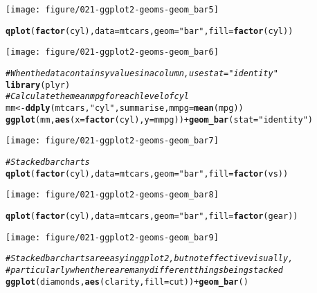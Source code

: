 \documentclass[a4paper,titlepage]{tufte-handout}\usepackage[]{graphicx}\usepackage[]{color}
\makeatletter
\def\maxwidth{ %
  \ifdim\Gin@nat@width>\linewidth
    \linewidth
  \else
    \Gin@nat@width
  \fi
}
\newcommand{\hlstr}[1]{\textcolor[rgb]{0.192,0.494,0.8}{#1}}%
\newcommand{\hlcom}[1]{\textcolor[rgb]{0.678,0.584,0.686}{\textit{#1}}}%
\newcommand{\hlopt}[1]{\textcolor[rgb]{0,0,0}{#1}}%
\newcommand{\hlstd}[1]{\textcolor[rgb]{0.345,0.345,0.345}{#1}}%
\newcommand{\hlkwb}[1]{\textcolor[rgb]{0.69,0.353,0.396}{#1}}%
\newcommand{\hlkwc}[1]{\textcolor[rgb]{0.333,0.667,0.333}{#1}}%
\newcommand{\hlkwd}[1]{\textcolor[rgb]{0.737,0.353,0.396}{\textbf{#1}}}%
\newenvironment{kframe}{%
 \def\at@end@of@kframe{}%
 \ifinner\ifhmode%
  \def\at@end@of@kframe{\end{minipage}}%
  \begin{minipage}{\columnwidth}%
 \fi\fi%
 \def\FrameCommand##1{\hskip\@totalleftmargin \hskip-\fboxsep
 \colorbox{shadecolor}{##1}\hskip-\fboxsep
     \hskip-\linewidth \hskip-\@totalleftmargin \hskip\columnwidth}%
 \MakeFramed {\advance\hsize-\width
   \@totalleftmargin\z@ \linewidth\hsize
   \@setminipage}}%
 {\par\unskip\endMakeFramed%
 \at@end@of@kframe}
\newenvironment{knitrout}{}{} %
\makeatother
\begin{document}
\begin{knitrout}
\begin{kframe}
\end{kframe}
\texttt{[image: figure/021-ggplot2-geoms-geom\_bar5]} 
\begin{kframe}\begin{alltt}
\hlkwd{qplot}\hlstd{(}\hlkwd{factor}\hlstd{(cyl),} \hlkwc{data}\hlstd{=mtcars,} \hlkwc{geom}\hlstd{=}\hlstr{"bar"}\hlstd{,} \hlkwc{fill}\hlstd{=}\hlkwd{factor}\hlstd{(cyl))}
\end{alltt}
\end{kframe}
\texttt{[image: figure/021-ggplot2-geoms-geom\_bar6]} 
\begin{kframe}\begin{alltt}
\hlcom{# When the data contains y values in a column, use stat="identity"}
\hlkwd{library}\hlstd{(plyr)}
\hlcom{# Calculate the mean mpg for each level of cyl}
\hlstd{mm} \hlkwb{<-} \hlkwd{ddply}\hlstd{(mtcars,} \hlstr{"cyl"}\hlstd{, summarise,} \hlkwc{mmpg} \hlstd{=} \hlkwd{mean}\hlstd{(mpg))}
\hlkwd{ggplot}\hlstd{(mm,} \hlkwd{aes}\hlstd{(}\hlkwc{x} \hlstd{=} \hlkwd{factor}\hlstd{(cyl),} \hlkwc{y} \hlstd{= mmpg))} \hlopt{+} \hlkwd{geom_bar}\hlstd{(}\hlkwc{stat} \hlstd{=} \hlstr{"identity"}\hlstd{)}
\end{alltt}
\end{kframe}
\texttt{[image: figure/021-ggplot2-geoms-geom\_bar7]} 
\begin{kframe}\begin{alltt}
\hlcom{# Stacked bar charts}
\hlkwd{qplot}\hlstd{(}\hlkwd{factor}\hlstd{(cyl),} \hlkwc{data}\hlstd{=mtcars,} \hlkwc{geom}\hlstd{=}\hlstr{"bar"}\hlstd{,} \hlkwc{fill}\hlstd{=}\hlkwd{factor}\hlstd{(vs))}
\end{alltt}
\end{kframe}
\texttt{[image: figure/021-ggplot2-geoms-geom\_bar8]} 
\begin{kframe}\begin{alltt}
\hlkwd{qplot}\hlstd{(}\hlkwd{factor}\hlstd{(cyl),} \hlkwc{data}\hlstd{=mtcars,} \hlkwc{geom}\hlstd{=}\hlstr{"bar"}\hlstd{,} \hlkwc{fill}\hlstd{=}\hlkwd{factor}\hlstd{(gear))}
\end{alltt}
\end{kframe}
\texttt{[image: figure/021-ggplot2-geoms-geom\_bar9]} 
\begin{kframe}\begin{alltt}
\hlcom{# Stacked bar charts are easy in ggplot2, but not effective visually,}
\hlcom{# particularly when there are many different things being stacked}
\hlkwd{ggplot}\hlstd{(diamonds,} \hlkwd{aes}\hlstd{(clarity,} \hlkwc{fill}\hlstd{=cut))} \hlopt{+} \hlkwd{geom_bar}\hlstd{()}

\end{alltt}
\end{kframe}
\end{knitrout}
\end{document}
